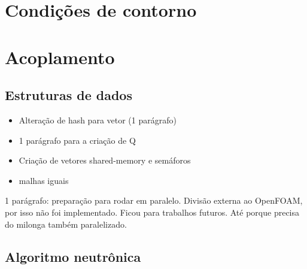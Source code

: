 \section{Condições de contorno}


\section{Acoplamento} %

\subsection{Estruturas de dados}

\begin{itemize}
\item Alteração de hash para vetor (1 parágrafo)
\item 1 parágrafo para a criação de Q
\item Criação de vetores shared-memory e semáforos
  \item malhas iguais
\end{itemize}

1 parágrafo: preparação para rodar em paralelo. Divisão externa ao OpenFOAM, por isso não foi
implementado. Ficou para trabalhos futuros. Até porque precisa do milonga também paralelizado.

\subsection{Algoritmo neutrônica}

